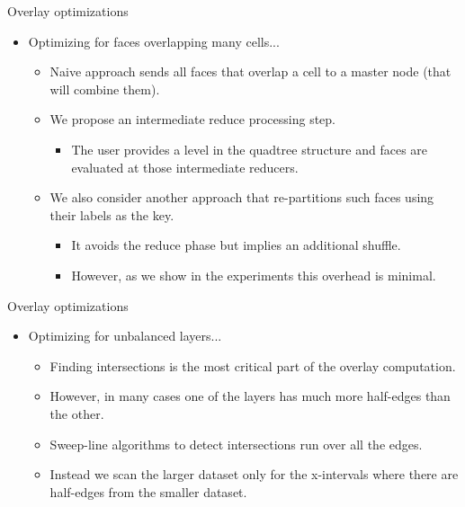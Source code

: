 \documentclass{beamer}
\begin{document}
 
    \begin{frame}{Overlay optimizations}
        \begin{itemize}
            \item Optimizing for faces overlapping many cells...
                \begin{itemize}
                    \item Naive approach sends all faces that overlap a cell to a master node (that will combine them).
                    \item We propose an intermediate reduce processing step.
                    \begin{itemize}
                    \item The user provides a level in the quadtree structure and faces are evaluated at those intermediate reducers.
                   \end{itemize}
                   \item We also consider another approach that re-partitions such faces using their labels as the key.
                    \begin{itemize}
                    \item It avoids the reduce phase but implies an additional shuffle.
                    \item However, as we show in the experiments this overhead is minimal.
                    \end{itemize}
                \end{itemize}
        \end{itemize}
    \end{frame}

    \begin{frame}{Overlay optimizations}
        \begin{itemize}
            \item Optimizing for unbalanced layers...
                \begin{itemize}
                    \item Finding intersections is the most critical part of the overlay computation.
                    \item However, in many cases one of the layers has much more half-edges than the other.
                    \item Sweep-line algorithms to detect intersections run over all the edges.
                    \item Instead we scan the larger dataset only for the x-intervals where there are half-edges from the smaller dataset.
                \end{itemize}
        \end{itemize}
    \end{frame}
    
\end{document}
